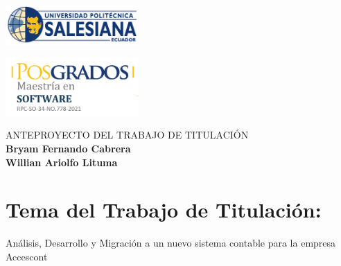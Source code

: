 \documentclass{article}
\begin{document}
\colorbox{white!10!}{
    \begin{minipage}[t]{0.05\textwidth} %
       \begin{flushright}
        \includegraphics[width=2in]{logo UPS.png}
       \end{flushright}
    \end{minipage}
    \begin{minipage}[H]{0.62 \textwidth} %
        \begin{center}
         
        \end{center}
     \end{minipage}
    \begin{minipage}[t]{0.05 \textwidth}
        \begin{flushleft}
        \hspace{10.25cm}
            \includegraphics[width=2in]{Posgrados.png}
        \end{flushleft}
    \end{minipage}
}

\vspace{0.1cm}
\begin{center}
{\large\textsc{ANTEPROYECTO DEL TRABAJO DE TITULACIÓN}} \\
\vspace{0.5cm}
{ \large \textbf{Bryam Fernando Cabrera}} \\ 
\vspace{0.25cm}
{ \large \textbf{Willian Ariolfo  Lituma}}
\end{center}
\vspace{0.1cm}

\section{Tema del Trabajo de Titulación:  }
\begin{center}
Análisis, Desarrollo y Migración a un nuevo sistema contable para la empresa Accescont 
\end{center}
\end{document}
